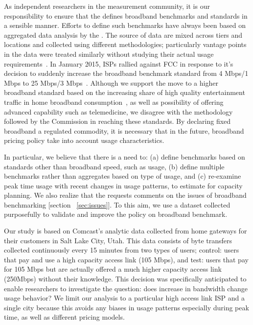 As independent researchers in the measurement community, it is our responsibility to ensure that the
\FCC defines broadband benchmarks and standards in a sensible manner. Efforts to define such
benchmarks have always been based on aggregated data analysis by the \FCC. The source of data are
mixed across tiers and locations and collected using different methodologies; particularly vantage
points in the data were treated similarly without studying their actual usage
requirements~\cite{fcc2015progress-report}.
In January 2015, ISPs rallied against FCC in response to
it’s decision to suddenly increase the broadband benchmark standard from 4 Mbps/1 Mbps to 25 Mbps/3
Mbps~\cite{fcc-redefine-ieee}. Although we support the move to a higher broadband
standard based on the increasing share of high quality entertainment traffic in home broadband
consumption~\cite{sandvine2014report1,sandvine2014report2}, as well as possibility of offering
advanced capability such as telemedicine, we disagree with the methodology followed by the
Commission in reaching these standards. By declaring fixed broadband a regulated commodity, it is
necessary that in the future, broadband pricing policy take into account usage characteristics.

In particular, we believe that there is a need to: (a) define benchmarks based on standards other
than broadband speed, such as usage, (b) define multiple benchmarks rather than aggregates based on
type of usage, and (c) re-examine peak time usage with recent changes in usage patterns, to estimate
for capacity planning. We also realize that the \FCC requests comments on the issues of broadband
benchmarking [section ~\ref{sec:issues}]. To this aim, we use a dataset collected purposefully to
validate and improve the \FCC policy on broadband benchmark.


Our study is based on Comcast’s analytic data collected from home gateways for their customers in
Salt Lake City, Utah. This data consists of byte transfers collected continuously every 15 minutes
from two types of users; control: users that pay and use a high capacity access link (105 Mbps), and
test: users that pay for 105 Mbps but are actually offered a much higher capacity access link
(250Mbps) without their knowledge. This decision was specifically anticipated to enable researchers
to investigate the question: does increase in bandwidth change usage behavior? We limit our analysis
to a particular high access link ISP and a single city because this avoids any biases in usage
patterns especially during peak time, as well as different pricing models. 


